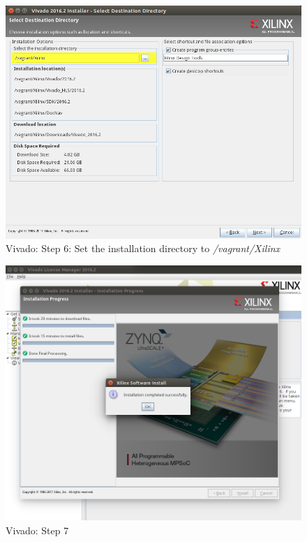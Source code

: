 \begin{figure}
    \centering
    \includegraphics[width=1\textwidth]{images/devguide/vivado-install-05.png}
    \caption[Vivado: Step 6]{%
        Vivado: Step 6: Set the installation directory to \textit{/vagrant/Xilinx}
    }
    \label{fig:devguide:vivado6}
\end{figure}

\begin{figure}
    \centering
    \includegraphics[width=1\textwidth,trim={0 8cm 0 3cm},clip]{images/devguide/vivado-install-10.png}
    \caption[Vivado: Step 7]{%
        Vivado: Step 7
    }
    \label{fig:devguide:vivado7}
\end{figure}

